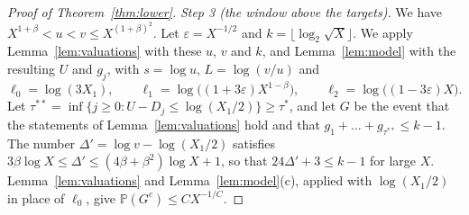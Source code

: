 \documentclass[12pt]{amsart}
\theoremstyle{definition}
\theoremstyle{remark}
\begin{document}
\begin{proof}[Proof of Theorem~\ref{thm:lower}]
\emph{Step 3 (the window above the targets).} We have $X^{1+\beta}<u<v\le X^{(1+\beta)^2}$. Let $\varepsilon=X^{-1/2}$ and $k=\lfloor\log_2\sqrt X\rfloor$. We apply Lemma~\ref{lem:valuations} with these $u$, $v$ and $k$, and Lemma~\ref{lem:model} with the resulting $U$ and $g_j$, with $s=\log u$, $L=\log(v/u)$ and
\[
\ell_0=\log(3X_1),\qquad\ell_1=\log\bigl((1+3\varepsilon)X^{1-\beta}\bigr),\qquad\ell_2=\log\bigl((1-3\varepsilon)X\bigr).
\]
Let $\tau^{**}=\inf\{j\ge0:U-D_j\le\log(X_1/2)\}\ge\tau^*$, and let $G$ be the event that the statements of Lemma~\ref{lem:valuations} hold and that $g_1+\dots+g_{\tau^{**}}\le k-1$. The number $\Delta'=\log v-\log(X_1/2)$ satisfies $3\beta\log X\le\Delta'\le(4\beta+\beta^2)\log X+1$, so that $24\Delta'+3\le k-1$ for large $X$. Lemma~\ref{lem:valuations} and Lemma~\ref{lem:model}(c), applied with $\log(X_1/2)$ in place of $\ell_0$, give $\mathbb P(G^c)\le CX^{-1/C}$.


\end{proof}
\end{document}

